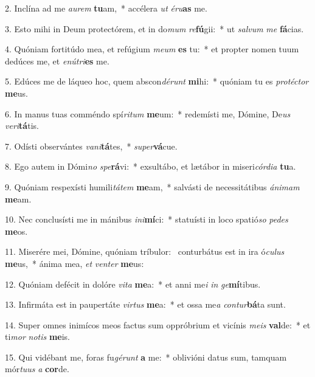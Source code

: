 2. Inclína ad me \textit{au}\textit{rem} \textbf{tu}am,~*  accélera \textit{ut} \textit{é}\textit{ru}\textbf{as} me.\

3. Esto mihi in Deum protectórem, et in do\textit{mum} \textit{re}\textbf{fú}gii:~*  ut \textit{sal}\textit{vum} \textit{me} \textbf{fá}cias.\

4. Quóniam fortitúdo mea, et refúgium \textit{me}\textit{um} \textbf{es} tu:~*  et propter nomen tuum dedúces me, et \textit{e}\textit{nú}\textit{tri}\textbf{es} me.\

5. Edúces me de láqueo hoc, quem abscon\textit{dé}\textit{runt} \textbf{mi}hi:~*  quóniam tu es \textit{pro}\textit{téc}\textit{tor} \textbf{me}us.\

6. In manus tuas comméndo spí\textit{ri}\textit{tum} \textbf{me}um:~*  redemísti me, Dómine, De\textit{us} \textit{ve}\textit{ri}\textbf{tá}tis.\

7. Odísti observántes \textit{va}\textit{ni}\textbf{tá}tes,~*  \textit{su}\textit{per}\textbf{vá}cue.\

8. Ego autem in Dómi\textit{no} \textit{spe}\textbf{rá}vi:~*  exsultábo, et lætábor in miseri\textit{cór}\textit{di}\textit{a} \textbf{tu}a.\

9. Quóniam respexísti humili\textit{tá}\textit{tem} \textbf{me}am,~*  salvásti de necessitátibus \textit{á}\textit{ni}\textit{mam} \textbf{me}am.\

10. Nec conclusísti me in mánibus \textit{in}\textit{i}\textbf{mí}ci:~*  statuísti in loco spatió\textit{so} \textit{pe}\textit{des} \textbf{me}os.\

11. Miserére mei, Dómine, quóniam tríbulor: \dag\  conturbátus est in ira ó\textit{cu}\textit{lus} \textbf{me}us,~*  ánima mea, \textit{et} \textit{ven}\textit{ter} \textbf{me}us:\

12. Quóniam defécit in dolóre \textit{vi}\textit{ta} \textbf{me}a:~*  et anni me\textit{i} \textit{in} \textit{ge}\textbf{mí}tibus.\

13. Infirmáta est in paupertáte \textit{vir}\textit{tus} \textbf{me}a:~*  et ossa me\textit{a} \textit{con}\textit{tur}\textbf{bá}ta sunt.\

14. Super omnes inimícos meos factus sum oppróbrium et vicínis \textit{me}\textit{is} \textbf{val}de:~*  et ti\textit{mor} \textit{no}\textit{tis} \textbf{me}is.\

15. Qui vidébant me, foras fu\textit{gé}\textit{runt} \textbf{a} me:~*  oblivióni datus sum, tamquam mór\textit{tu}\textit{us} \textit{a} \textbf{cor}de.\


